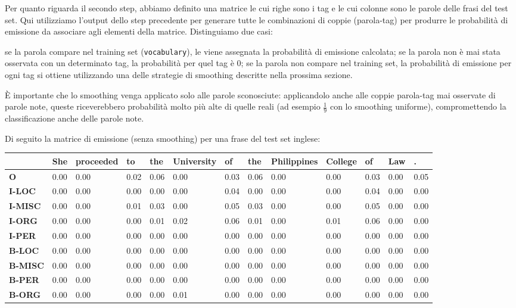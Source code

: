 \documentclass[a4paper,11pt,notitlepage]{report}
\begin{document}
Per quanto riguarda il secondo step, abbiamo definito una matrice le cui righe sono i tag e le cui colonne sono le parole delle frasi del test set. Qui utilizziamo l'output dello step precedente per generare tutte le combinazioni di coppie (parola-tag) per produrre le probabilità di emissione da associare agli elementi della matrice. Distinguiamo due casi:
\begin{outline}
    \1 se la parola compare nel training set (\texttt{vocabulary}), le viene assegnata la probabilità di emissione calcolata; se la parola non è mai stata osservata con un determinato tag, la probabilità per quel tag è 0;
    \1 se la parola non compare nel training set, la probabilità di emissione per ogni tag si ottiene utilizzando una delle strategie di smoothing descritte nella prossima sezione.
\end{outline}
È importante che lo smoothing venga applicato solo alle parole sconosciute: applicandolo anche alle coppie parola-tag mai osservate di parole note, queste riceverebbero probabilità molto più alte di quelle reali (ad esempio $\frac{1}{9}$ con lo smoothing uniforme), compromettendo la classificazione anche delle parole note.

Di seguito la matrice di emissione (senza smoothing) per una frase del test set inglese:

\begin{center}
\scriptsize
\setlength{\tabcolsep}{3pt}
\begin{tabular}{|l|l|l|l|l|l|l|l|l|l|l|l|l|}
\hline
\textbf{} & \textbf{She} & \textbf{proceeded} & \textbf{to} & \textbf{the} & \textbf{University} & \textbf{of} & \textbf{the} & \textbf{Philippines} & \textbf{College} & \textbf{of} & \textbf{Law} & \textbf{.} \\ \hline
\textbf{O} & 0.00 & 0.00 & 0.02 & 0.06 & 0.00 & 0.03 & 0.06 & 0.00 & 0.00 & 0.03 & 0.00 & 0.05 \\ \hline
\textbf{I-LOC} & 0.00 & 0.00 & 0.00 & 0.00 & 0.00 & 0.04 & 0.00 & 0.00 & 0.00 & 0.04 & 0.00 & 0.00 \\ \hline
\textbf{I-MISC} & 0.00 & 0.00 & 0.01 & 0.03 & 0.00 & 0.05 & 0.03 & 0.00 & 0.00 & 0.05 & 0.00 & 0.00 \\ \hline
\textbf{I-ORG} & 0.00 & 0.00 & 0.00 & 0.01 & 0.02 & 0.06 & 0.01 & 0.00 & 0.01 & 0.06 & 0.00 & 0.00 \\ \hline
\textbf{I-PER} & 0.00 & 0.00 & 0.00 & 0.00 & 0.00 & 0.00 & 0.00 & 0.00 & 0.00 & 0.00 & 0.00 & 0.00 \\ \hline
\textbf{B-LOC} & 0.00 & 0.00 & 0.00 & 0.00 & 0.00 & 0.00 & 0.00 & 0.00 & 0.00 & 0.00 & 0.00 & 0.00 \\ \hline
\textbf{B-MISC} & 0.00 & 0.00 & 0.00 & 0.00 & 0.00 & 0.00 & 0.00 & 0.00 & 0.00 & 0.00 & 0.00 & 0.00 \\ \hline
\textbf{B-PER} & 0.00 & 0.00 & 0.00 & 0.00 & 0.00 & 0.00 & 0.00 & 0.00 & 0.00 & 0.00 & 0.00 & 0.00 \\ \hline
\textbf{B-ORG} & 0.00 & 0.00 & 0.00 & 0.00 & 0.01 & 0.00 & 0.00 & 0.00 & 0.00 & 0.00 & 0.00 & 0.00 \\ \hline
\end{tabular}
\end{center}
\end{document}
